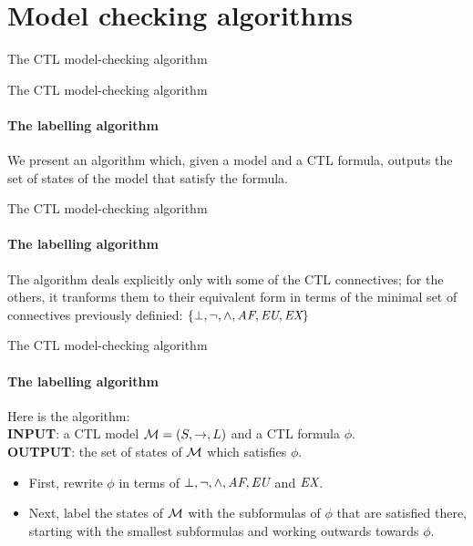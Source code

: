 \section{Model checking algorithms}

\begin{frame}{The CTL model-checking algorithm}
\end{frame}

\begin{frame}{The CTL model-checking algorithm}
	\framesubtitle{The labelling algorithm}
	We present an algorithm which, given a model and a CTL formula, outputs the set of states of the model that satisfy the formula. 
\end{frame}

\begin{frame}{The CTL model-checking algorithm}
	\framesubtitle{The labelling algorithm}
	The algorithm deals explicitly only with some of the CTL connectives; for the others, it tranforms them to their equivalent form in terms of the minimal set of connectives previously definied: $\{\bot, \neg, \land, \textit{A}\textit{F}, \textit{E}\textit{U}, \textit{E}\textit{X} \}$ 
\end{frame}

\begin{frame}{The CTL model-checking algorithm}
	\framesubtitle{The labelling algorithm}
	Here is the algorithm:\\
	\pause
	{\bf INPUT}: a CTL model $\mathcal{M} = (S, \to, L)$ and a CTL formula $\phi$.\\
	{\bf OUTPUT}: the set of states of $\mathcal{M}$ which satisfies $\phi$.\\
	\pause
	\begin{itemize}
		\item
		{
			First, rewrite $\phi$ in terms of $\bot, \neg, \land, \textit{A}\textit{F}, \textit{E}\textit{U}$ and $\textit{E}\textit{X}$.
			\pause
		}
		\item
		{
			Next, label the states of $\mathcal{M}$ with the subformulas of $\phi$ that are satisfied there, starting with the smallest subformulas and working outwards towards $\phi$.
		}
	\end{itemize}
\end{frame}

